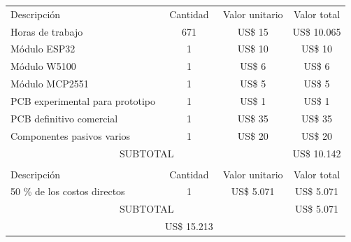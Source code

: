 \documentclass[
11pt, %
]{charter}
\begin{document}
\begin{table}[htpb]
\centering
\begin{tabularx}{\linewidth}{@{}|X|c|r|r|@{}}
\hline
\rowcolor[HTML]{C0C0C0} 
\multicolumn{4}{|c|}{\cellcolor[HTML]{C0C0C0}COSTOS DIRECTOS} \\ \hline
\rowcolor[HTML]{C0C0C0} 
Descripción &
  \multicolumn{1}{c|}{\cellcolor[HTML]{C0C0C0}Cantidad} &
  \multicolumn{1}{c|}{\cellcolor[HTML]{C0C0C0}Valor unitario} &
  \multicolumn{1}{c|}{\cellcolor[HTML]{C0C0C0}Valor total} \\ \hline
\multicolumn{1}{|l|}{Horas de trabajo} &671
   &\multicolumn{1}{c|}{US\$ 15}
   &\multicolumn{1}{c|}{US\$ 10.065}
   \\ \hline
\multicolumn{1}{|l|}{Módulo ESP32} &1
   &\multicolumn{1}{c|}{US\$ 10}
   &\multicolumn{1}{c|}{US\$ 10}
   \\ \hline
\multicolumn{1}{|l|}{Módulo W5100} &1
   &\multicolumn{1}{c|}{US\$ 6}
   &\multicolumn{1}{c|}{US\$ 6}
   \\ \hline
\multicolumn{1}{|l|}{Módulo MCP2551} &1
   &\multicolumn{1}{c|}{US\$ 5}
   &\multicolumn{1}{c|}{US\$ 5}
   \\ \hline
\multicolumn{1}{|l|}{PCB experimental para prototipo} &1
   &\multicolumn{1}{c|}{US\$ 1}
   &\multicolumn{1}{c|}{US\$ 1}
   \\ \hline
\multicolumn{1}{|l|}{PCB definitivo comercial} &1
   &\multicolumn{1}{c|}{US\$ 35}
   &\multicolumn{1}{c|}{US\$ 35}
   \\ \hline
\multicolumn{1}{|l|}{Componentes pasivos varios} &1
   &\multicolumn{1}{c|}{US\$ 20}
   &\multicolumn{1}{c|}{US\$ 20}
   \\ \hline
\multicolumn{3}{|c|}{SUBTOTAL} &
  \multicolumn{1}{c|}{US\$ 10.142} \\ \hline
\rowcolor[HTML]{C0C0C0} 
\multicolumn{4}{|c|}{\cellcolor[HTML]{C0C0C0}COSTOS INDIRECTOS} \\ \hline
\rowcolor[HTML]{C0C0C0} 
Descripción &
  \multicolumn{1}{c|}{\cellcolor[HTML]{C0C0C0}Cantidad} &
  \multicolumn{1}{c|}{\cellcolor[HTML]{C0C0C0}Valor unitario} &
  \multicolumn{1}{c|}{\cellcolor[HTML]{C0C0C0}Valor total} \\ \hline
\multicolumn{1}{|l|}{50 \% de los costos directos } &\multicolumn{1}{c|}{1}
   &\multicolumn{1}{c|}{US\$ 5.071}
   &\multicolumn{1}{c|}{US\$ 5.071}
   \\ \hline
\multicolumn{3}{|c|}{SUBTOTAL} &
  \multicolumn{1}{c|}{US\$ 5.071} \\ \hline
\rowcolor[HTML]{C0C0C0}
\multicolumn{3}{|c|}{TOTAL} & \multicolumn{1}{c|}{US\$ 15.213}
   \\ \hline
\end{tabularx}%
\end{table}
\end{document}
